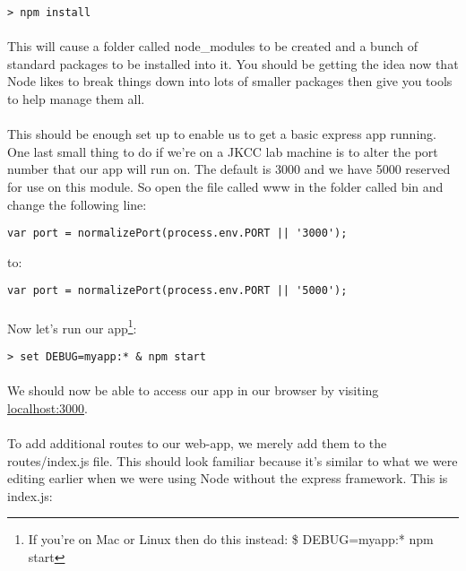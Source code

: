 \documentclass[10pt, a4paper, twosize]{article}
\begin{document}
\begin{lstlisting}[style=DOS]
    > npm install
\end{lstlisting}

\paragraph{} This will cause a folder called node\_modules to be created and a bunch of standard packages to be installed into it. You should be getting the idea now that Node likes to break things down into lots of smaller packages then give you tools to help manage them all.

\paragraph{} This should be enough set up to enable us to get a basic express app running. One last small thing to do if we're on a JKCC lab machine is to alter the port number that our app will run on. The default is 3000 and we have 5000 reserved for use on this module. So open the file called www in the folder called bin and change the following line:

\begin{lstlisting}
var port = normalizePort(process.env.PORT || '3000');
\end{lstlisting}

to:

\begin{lstlisting}
var port = normalizePort(process.env.PORT || '5000');
\end{lstlisting}

\paragraph{} Now let's run our app\footnote{If you're on Mac or Linux then do this instead: \$ DEBUG=myapp:* npm start}:

\begin{lstlisting}[style=DOS]
    > set DEBUG=myapp:* & npm start
\end{lstlisting}

\paragraph{} We should now be able to access our app in our browser by visiting \url{localhost:3000}.

\paragraph{} To add additional routes to our web-app, we merely add them to the routes/index.js file. This should look familiar because it's similar to what we were editing earlier when we were using Node without the express framework. This is index.js:
\end{document}
